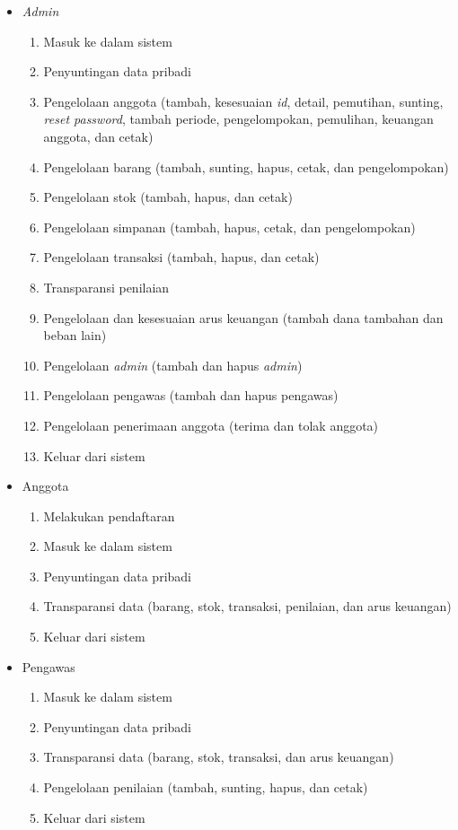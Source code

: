 \begin{itemize}
	\item \textit{Admin}
	\begin{enumerate}
		\item Masuk ke dalam sistem
		\item Penyuntingan data pribadi
		\item Pengelolaan anggota (tambah, kesesuaian \textit{id}, detail, pemutihan, sunting, \textit{reset password}, tambah periode, pengelompokan, pemulihan, keuangan anggota, dan cetak)
		\item Pengelolaan barang (tambah, sunting, hapus, cetak, dan pengelompokan)
		\item Pengelolaan stok (tambah, hapus, dan cetak)
		\item Pengelolaan simpanan (tambah, hapus, cetak, dan pengelompokan)
		\item Pengelolaan transaksi (tambah, hapus, dan cetak)
		\item Transparansi penilaian
		\item Pengelolaan dan kesesuaian arus keuangan (tambah dana tambahan dan beban lain)
		\item Pengelolaan \textit{admin} (tambah dan hapus \textit{admin})
		\item Pengelolaan pengawas (tambah dan hapus pengawas)
		\item Pengelolaan penerimaan anggota (terima dan tolak anggota)
		\item Keluar dari sistem
	\end{enumerate}

	\item Anggota
	\begin{enumerate}
		\item Melakukan pendaftaran
		\item Masuk ke dalam sistem
		\item Penyuntingan data pribadi
		\item Transparansi data (barang, stok, transaksi, penilaian, dan arus keuangan)
		\item Keluar dari sistem
	\end{enumerate}
	
	\item Pengawas
	\begin{enumerate}
		\item Masuk ke dalam sistem
		\item Penyuntingan data pribadi
		\item Transparansi data (barang, stok, transaksi, dan arus keuangan)
		\item Pengelolaan penilaian (tambah, sunting, hapus, dan cetak)
		\item Keluar dari sistem
		\end{enumerate}
	\end{itemize}

